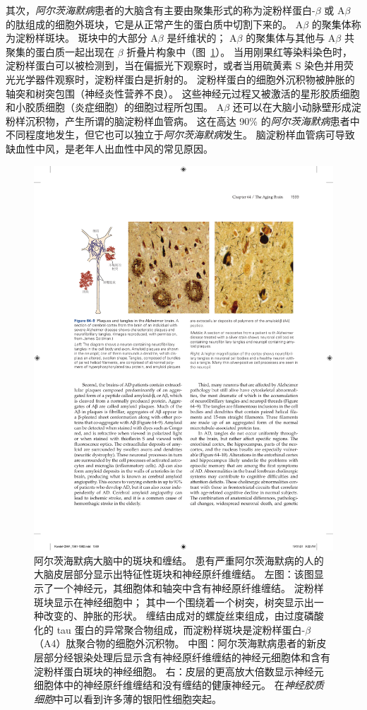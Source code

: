 其次，\textit{阿尔茨海默病}患者的大脑含有主要由聚集形式的称为淀粉样蛋白-$\beta$ 或 A$\beta$ 的肽组成的细胞外斑块，它是从正常产生的蛋白质中切割下来的。
A$\beta$ 的聚集体称为淀粉样斑块。
斑块中的大部分 A$\beta$ 是纤维状的；
A$\beta$ 的聚集体与其他与 A$\beta$ 共聚集的蛋白质一起出现在 $\beta$ 折叠片构象中（图~\ref{fig:64_9}）。
当用刚果红等染料染色时，淀粉样蛋白可以被检测到，当在偏振光下观察时，或者当用硫黄素 S 染色并用荧光光学器件观察时，淀粉样蛋白是折射的。
淀粉样蛋白的细胞外沉积物被肿胀的轴突和树突包围（神经炎性营养不良）。
这些神经元过程又被激活的星形胶质细胞和小胶质细胞（炎症细胞）的细胞过程所包围。
A$\beta$ 还可以在大脑小动脉壁形成淀粉样沉积物，产生所谓的脑淀粉样血管病。
这在高达 90\% 的\textit{阿尔茨海默病}患者中不同程度地发生，但它也可以独立于\textit{阿尔茨海默病}发生。
脑淀粉样血管病可导致缺血性中风，是老年人出血性中风的常见原因。


\begin{figure}[htbp]
	\centering
	\includegraphics[width=1.0\linewidth]{chap64/fig_64_9}
	\caption{阿尔茨海默病大脑中的斑块和缠结。
		患有严重阿尔茨海默病的人的大脑皮层部分显示出特征性斑块和神经原纤维缠结。
		左图：该图显示了一个神经元，其细胞体和轴突中含有神经原纤维缠结。
		淀粉样斑块显示在神经细胞中；
		其中一个围绕着一个树突，树突显示出一种改变的、肿胀的形状。
		缠结由成对的螺旋丝束组成，由过度磷酸化的 tau 蛋白的异常聚合物组成，而淀粉样斑块是淀粉样蛋白-$\beta$（A4）肽聚合物的细胞外沉积物。
		中图：阿尔茨海默病患者的新皮层部分经银染处理后显示含有神经原纤维缠结的神经元细胞体和含有淀粉样蛋白斑块的神经细胞。
		右：皮层的更高放大倍数显示神经元细胞体中的神经原纤维缠结和没有缠结的健康神经元。
		在\textit{神经胶质细胞}中可以看到许多薄的银阳性细胞突起。}
	\label{fig:64_9}
\end{figure}


